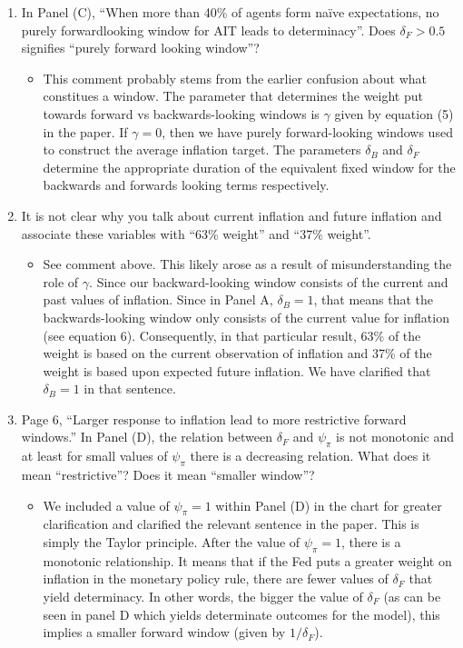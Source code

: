 \documentclass[english,authoryear,12pt]{elsarticle}
\begin{document}
\begin{enumerate}
\begin{itemize}
	\end{itemize}
	\item In Panel (C), ``When more than 40\% of agents form naïve expectations, no purely forwardlooking window for AIT leads to determinacy”. Does $\delta_F > 0.5$ signifies “purely forward looking window”?
	\begin{itemize}
		\item This comment probably stems from the earlier confusion about what constitues a window. The parameter that determines the weight put towards forward vs backwards-looking windows is $\gamma$ given by equation (5) in the paper. If $\gamma=0$, then we have purely forward-looking windows used to construct the average inflation target. The parameters $\delta_B$ and $\delta_F$ determine the appropriate duration of the equivalent fixed window for the backwards and forwards looking terms respectively. 
	\end{itemize}
	\item It is not clear why you talk about current inflation and future inflation and associate these variables with “63\% weight” and “37\% weight”.
	\begin{itemize}
		\item See comment above. This likely arose as a result of misunderstanding the role of $\gamma$. Since our backward-looking window consists of the current and past values of inflation. Since in Panel A, $\delta_B=1$, that means that the backwards-looking window only consists of the current value for inflation (see equation 6). Consequently, in that particular result, 63\% of the weight is based on the current observation of inflation and 37\% of the weight is based upon expected future inflation. We have clarified that $\delta_B=1$ in that sentence.
	\end{itemize}
	\item Page 6, “Larger response to inflation lead to more restrictive forward windows.” In Panel (D), the relation between $\delta_F$ and $\psi_\pi$ is not monotonic and at least for small values of $\psi_\pi$ there is a decreasing relation. What does it mean “restrictive”? Does it mean “smaller
	window”?
	\begin{itemize}
		\item We included a value of $\psi_\pi = 1$ within Panel (D) in the chart for greater clarification and clarified the relevant sentence in the paper. This is simply the Taylor principle. After the value of $\psi_\pi=1$, there is a monotonic relationship. It means that if the Fed puts a greater weight on inflation in the monetary policy rule, there are fewer values of $\delta_F$ that yield determinacy. In other words, the bigger the value of $\delta_F$ (as can be seen in panel D which yields determinate outcomes for the model), this implies a smaller forward window (given by $1/\delta_F$).

\end{itemize}
\end{enumerate}
\end{document}
